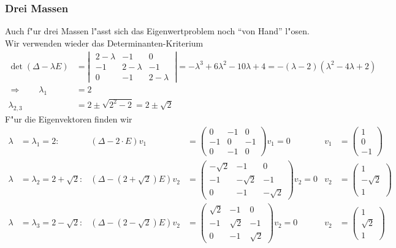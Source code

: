 \subsubsection{Drei Massen}
Auch f"ur drei Massen l"asst sich das Eigenwertproblem noch
``von Hand'' l"osen. Wir verwenden wieder das Determinanten-Kriterium
\begin{align*}
\det(\Delta -\lambda E)&=\left|\;
\begin{matrix}
2-\lambda&-1&0\\
-1&2-\lambda&-1\\
0&-1&2-\lambda
\end{matrix}
\;\right|
=-\lambda^3+6\lambda^2-10\lambda+4=-(\lambda-2)(\lambda^2-4\lambda+2)
\\
\Rightarrow\qquad
\lambda_1&=2\\
\lambda_{2,3}&=2\pm\sqrt{2^2-2}=2\pm\sqrt{2}
\end{align*}
F"ur die Eigenvektoren finden wir
\begin{align*}
\lambda&=\lambda_1=2:
&
(\Delta - 2\cdot E)v_1&=\begin{pmatrix}
0&-1&0\\
-1&0&-1\\
0&-1&0\end{pmatrix}v_1
=0&v_1&=\begin{pmatrix}1\\0\\-1\end{pmatrix}
\\
\lambda&=\lambda_2=2+\sqrt{2}:
&
(\Delta -(2+\sqrt{2})E)v_2&=\begin{pmatrix}
-\sqrt{2}&-1&0\\
-1&-\sqrt{2}&-1\\
0&-1&-\sqrt{2}
\end{pmatrix}v_2=0&
v_2&=\begin{pmatrix}
1\\-\sqrt{2}\\1
\end{pmatrix}
\\
\lambda&=\lambda_3=2-\sqrt{2}:
&
(\Delta -(2-\sqrt{2})E)v_2&=\begin{pmatrix}
\sqrt{2}&-1&0\\
-1&\sqrt{2}&-1\\
0&-1&\sqrt{2}
\end{pmatrix}v_2=0&
v_2&=\begin{pmatrix}
1\\\sqrt{2}\\1
\end{pmatrix}
\\
\end{align*}

